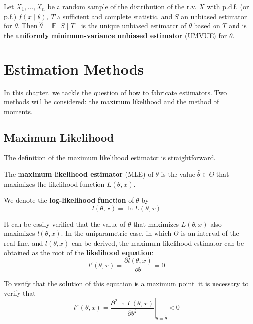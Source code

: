\documentclass[12pt,a4paper]{report}
\begin{document}
\begin{theorem}
    Let $X_1, \ldots, X_n$ be a random sample of the distribution of the r.v. $X$ with p.d.f. (or p.f.) $f( x \mid \theta)$, $T$ a sufficient and complete statistic, and $S$ an unbiased estimator for $\theta$. Then $\hat{\theta} = \mathbb{E}[S \mid T]$ is the unique unbiased estimator of $\theta$ based on $T$ and is the \textbf{uniformly minimum-variance unbiased estimator} (UMVUE) for $\theta$.
\end{theorem}

\chapter{Estimation Methods}

In this chapter, we tackle the question of how to fabricate estimators. Two methods will be considered: the maximum likelihood and the method of moments. 

\section{Maximum Likelihood}

The definition of the maximum likelihood estimator is straightforward.

\begin{definition}
    The \textbf{maximum likelihood estimator} (MLE) of $\theta$ is the value $\hat{\theta} \in \Theta$ that maximizes the likelihood function $L(\theta, x)$.

    We denote the \textbf{log-likelihood function} of $\theta$ by 
    \begin{equation*}
        l(\theta, x) = \ln L(\theta, x)
    \end{equation*}
\end{definition}

It can be easily verified that the value of $\theta$ that maximizes $L(\theta, x)$ also maximizes $l(\theta, x)$. In the uniparametric case, in which $\Theta$ is an interval of the real line, and $l(\theta, x)$ can be derived, the maximum likelihood estimator can be obtained as the root of the \textbf{likelihood equation}:
\begin{equation}\label{eq:likelihood_eq}
    l'(\theta, x) = \frac{\partial l(\theta,x)}{\partial \theta} = 0
\end{equation}

To verify that the solution of this equation is a maximum point, it is necessary to verify that 
\begin{equation}
    l''(\theta, x) = \left. \frac{\partial^2 \ln L(\theta,x)}{\partial \theta^2}\right|_{\theta = \hat{\theta}} < 0
\end{equation}
\end{document}
